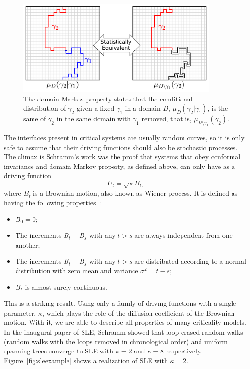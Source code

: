\begin{figure}[b]
\begin{center}
    \includegraphics[width=0.9\textwidth]{chapters/ch4-sle/figs/sle_dmp}
\end{center}
\caption{The domain Markov property states that the conditional distribution of
    $\gamma_2$ given a fixed $\gamma_1$ in a domain $D$,
    $\mu_D(\gamma_2|\gamma_1)$, is the same of $\gamma_2$ in the same domain
    with $\gamma_1$ removed, that is, $\mu_{D\setminus\gamma_1}(\gamma_2)$.}
\label{fig:dmp}
\end{figure}


The interfaces present in critical systems are usually random curves, so it is
only safe to assume that their driving functions should also be stochastic
processes. The climax is Schramm's work was the proof that systems that obey
conformal invariance and domain Markov property, as defined above, can only
have as a driving function
\begin{equation}
    U_{t}=\sqrt{\kappa}B_{t},
\end{equation}
where $B_t$ is a Brownian motion, also known as Wiener process.
It is defined as having the following properties~\cite{Durrett1996}:
\begin{itemize}
    \item $B_0=0$;
    \item The increments $B_t-B_s$ with any $t>s$ are always independent from
        one another;
    \item The increments $B_t-B_s$ with any $t>s$ are distributed according to
        a normal distribution with zero mean and variance $\sigma^2=t-s$;
    \item $B_t$ is almost surely continuous.
\end{itemize}
This is a striking result. Using only a family of driving functions with a
single parameter, $\kappa$, which plays the role of the diffusion coefficient
of the Brownian motion. With it, we are able to describe all properties of many
criticality models. In the inaugural paper of SLE, Schramm showed that
loop-erased random walks (random walks with the loops removed in chronological
order) and uniform spanning trees converge to SLE with $\kappa=2$ and
$\kappa=8$ respectively. Figure~\ref{fig:sleexample} shows a realization of SLE
with $\kappa=2$.

